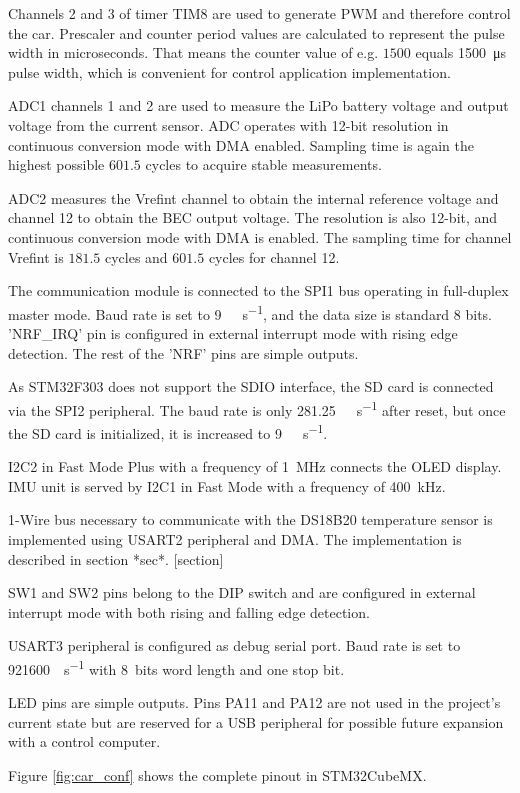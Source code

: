 Channels 2 and 3 of timer TIM8 are used to generate PWM and therefore control the car. Prescaler and counter period values are calculated to represent the pulse width in microseconds. That means the counter value of e.g. $1500$ equals \SI{1500}{\micro\second} pulse width, which is convenient for control application implementation.

ADC1 channels 1 and 2 are used to measure the LiPo battery voltage and output voltage from the current sensor. ADC operates with 12-bit resolution in continuous conversion mode with DMA enabled. Sampling time is again the highest possible $601.5$ cycles to acquire stable measurements.

ADC2 measures the Vrefint channel to obtain the internal reference voltage and channel 12 to obtain the BEC output voltage. The resolution is also 12-bit, and continuous conversion mode with DMA is enabled. The sampling time for channel Vrefint is $181.5$ cycles and $601.5$ cycles for channel 12.

The communication module is connected to the SPI1 bus operating in full-duplex master mode. Baud rate is set to \SI{9}{\mega\bit\per\second}, and the data size is standard 8 bits. 'NRF\_IRQ' pin is configured in external interrupt mode with rising edge detection. The rest of the 'NRF' pins are simple outputs.

As STM32F303 does not support the SDIO interface, the SD card is connected via the SPI2 peripheral. The baud rate is only \SI{281.25}{\kilo\bit\per\second} after reset, but once the SD card is initialized, it is increased to \SI{9}{\mega\bit\per\second}.

I2C2 in Fast Mode Plus with a frequency of \SI{1}{\MHz} connects the OLED display. IMU unit is served by I2C1 in Fast Mode with a frequency of \SI{400}{\kHz}.

1-Wire bus necessary to communicate with the DS18B20 temperature sensor is implemented using USART2 peripheral and DMA. The implementation is described in section *sec*. [\todo section]

SW1 and SW2 pins belong to the DIP switch and are configured in external interrupt mode with both rising and falling edge detection.

USART3 peripheral is configured as debug serial port. Baud rate is set to \SI{921600}{\bit\per\second} with 8~bits word length and one stop bit.

LED pins are simple outputs. Pins PA11 and PA12 are not used in the project's current state but are reserved for a USB peripheral for possible future expansion with a control computer.

Figure \ref{fig:car_conf} shows the complete pinout in STM32CubeMX.